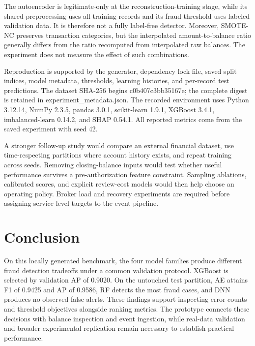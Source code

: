 \documentclass[conference]{IEEEtran}
\begin{document}
The autoencoder is legitimate-only at the reconstruction-training stage, while its shared preprocessing uses all training records and its fraud threshold uses labeled validation data. It is therefore not a fully label-free detector. Moreover, SMOTE-NC preserves transaction categories, but the interpolated amount-to-balance ratio generally differs from the ratio recomputed from interpolated raw balances. The experiment does not measure the effect of such combinations.

Reproduction is supported by the generator, dependency lock file, saved split indices, model metadata, thresholds, learning histories, and per-record test predictions. The dataset SHA-256 begins c0b407c3bb35167e; the complete digest is retained in experiment\_metadata.json. The recorded environment uses Python 3.12.14, NumPy 2.3.5, pandas 3.0.1, scikit-learn 1.9.1, XGBoost 3.4.1, imbalanced-learn 0.14.2, and SHAP 0.54.1. All reported metrics come from the saved experiment with seed 42.

A stronger follow-up study would compare an external financial dataset, use time-respecting partitions where account history exists, and repeat training across seeds. Removing closing-balance inputs would test whether useful performance survives a pre-authorization feature constraint. Sampling ablations, calibrated scores, and explicit review-cost models would then help choose an operating policy. Broker load and recovery experiments are required before assigning service-level targets to the event pipeline.

\section{Conclusion}
On this locally generated benchmark, the four model families produce different fraud detection tradeoffs under a common validation protocol. XGBoost is selected by validation AP of 0.9020. On the untouched test partition, AE attains F1 of 0.9425 and AP of 0.9586, RF detects the most fraud cases, and DNN produces no observed false alerts. These findings support inspecting error counts and threshold objectives alongside ranking metrics. The prototype connects these decisions with balance inspection and event ingestion, while real-data validation and broader experimental replication remain necessary to establish practical performance.
\end{document}
